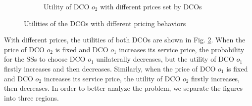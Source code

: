 \documentclass[twocolumn,10pt]{IEEEtran}
\begin{document}
\begin{figure}[t]
\begin{subfigure}[b]{0.5\textwidth}
        \caption{Utility of DCO $o_2$ with different prices set by DCOs}
        \label{fig:DCO 2}
    \end{subfigure}
    \caption{Utilities of the DCOs with different pricing behaviors}
    \label{fig:dco_vs_prices}\vspace{-0.2 cm}
\end{figure}


With different prices, the utilities of both DCOs are shown in Fig. \ref{fig:dco_vs_prices}. When the price of DCO $o_2$ is fixed and DCO $o_1$ increases its service price, the probability for the SSs to choose DCO $o_1$ unilaterally decreases, but the utility of DCO $o_1$ firstly increases and then decreases. Similarly, when the price of DCO $o_1$ is fixed and DCO $o_2$ increases its service price, the utility of DCO $o_2$ firstly increases, then decreases. In order to better analyze the problem, we separate the figures into three regions.
\end{document}

